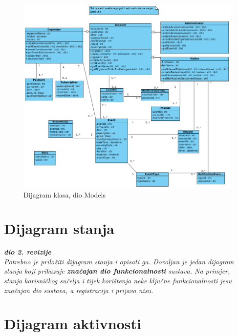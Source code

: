 			\newpage

			\begin{figure}[htbp]
				\centering
				\includegraphics[width=1\textwidth]{dijagrami/dijagram_mvc_models.png}
				\caption{Dijagram klasa, dio Models}
			\label{fig:my_image}
			\end{figure}


			\eject
		
		\newpage
		\section{Dijagram stanja}
			
			\textbf{\textit{dio 2. revizije}}\\
			
			\textit{Potrebno je priložiti dijagram stanja i opisati ga. Dovoljan je jedan dijagram stanja koji prikazuje \textbf{značajan dio funkcionalnosti} sustava. Na primjer, stanja korisničkog sučelja i tijek korištenja neke ključne funkcionalnosti jesu značajan dio sustava, a registracija i prijava nisu. }
			
			
			\eject 
		
		\section{Dijagram aktivnosti}
			
			
